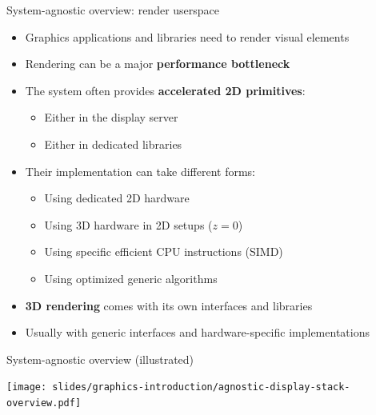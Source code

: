 \begin{frame}{System-agnostic overview: render userspace}
  \begin{itemize}
  \item Graphics applications and libraries need to render visual elements
  \item Rendering can be a major \textbf{performance bottleneck}
  \item The system often provides \textbf{accelerated 2D primitives}:
    \begin{itemize}
    \item Either in the display server
    \item Either in dedicated libraries
    \end{itemize}
  \item Their implementation can take different forms:
    \begin{itemize}
    \item Using dedicated 2D hardware
    \item Using 3D hardware in 2D setups (\(z = 0\))
    \item Using specific efficient CPU instructions (SIMD)
    \item Using optimized generic algorithms
    \end{itemize}
  \item \textbf{3D rendering} comes with its own interfaces and libraries
  \item Usually with generic interfaces and hardware-specific implementations
  \end{itemize}
\end{frame}

\begin{frame}{System-agnostic overview (illustrated)}
  \begin{center}
  \texttt{[image: slides/graphics-introduction/agnostic-display-stack-overview.pdf]}
  \end{center}
\end{frame}

